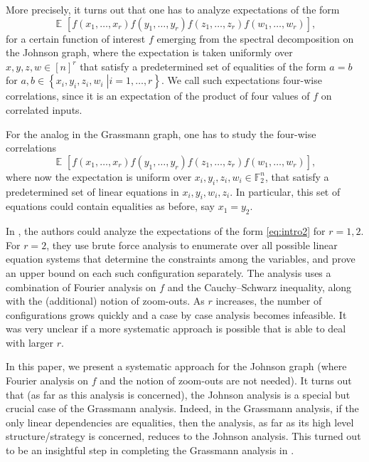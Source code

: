 \documentclass{toc}
\newcommand\sett[2]{\left\{ \left. #1 \;\right\vert #2 \right\}}
\newcommand\Expect[2]{{\mathop{\mathbb{E}}_{#1}\left[ {#2} \right]}}
\begin{document}
More precisely, it turns out that one has to analyze expectations of the form
\begin{equation}\label{eq:intro}
\Expect{}{f(x_1,\ldots,x_r)f(y_1,\ldots,y_r)f(z_1,\ldots,z_r)f(w_1,\ldots,w_r)},
\end{equation}
for a certain function of interest $f$ emerging from the spectral decomposition on the Johnson graph, %
where the expectation is taken
uniformly over $x,y,z,w\in [n]^r$ that satisfy a predetermined set of equalities of the form $a = b$ for $a,b\in\sett{x_i,y_i,z_i,w_i}{i=1,\ldots,r}$.
We call such expectations four-wise correlations, since it is an expectation of the product of four values of $f$ on correlated inputs.

For the analog in the Grassmann graph, %
 one has to study the four-wise correlations
\begin{equation}\label{eq:intro2}
\Expect{}{f(x_1,\ldots,x_r)f(y_1,\ldots,y_r)f(z_1,\ldots,z_r)f(w_1,\ldots,w_r)},
\end{equation}
where now the expectation is uniform over $x_i,y_i,z_i,w_i\in \mathbb{F}_2^{n}$, that satisfy a predetermined set of linear equations in $x_i,y_i,w_i,z_i$. In particular,
this set of equations could contain equalities as before, say $x_1 = y_2$.

In \cite{DKKMSgras}, the authors could analyze the expectations of the form \eqref{eq:intro2} for $r=1,2$. For $r=2$, they use brute force analysis to enumerate
over all possible linear equation systems that determine the constraints among the variables, and prove an upper bound on each such configuration separately. %
The analysis uses
a combination of Fourier analysis on $f$ and the Cauchy--Schwarz inequality, along with the (additional) notion of zoom-outs.
As $r$ increases, the number of configurations grows quickly and a case by case analysis becomes infeasible.
It was very unclear if a more systematic approach is possible that is able to deal with larger $r$.

In this paper, we present a systematic approach for the Johnson graph %
%
(where  %
Fourier analysis on $f$ and the notion of zoom-outs %
are  %
not needed).
It turns out that (as far as this analysis is concerned), the Johnson
analysis is a special but crucial case of the Grassmann analysis. Indeed,
in the Grassmann analysis, if the only linear dependencies are
equalities, then the analysis, as far as its high level
structure/strategy is concerned, reduces to the Johnson analysis. This
turned out to be an insightful step in completing the Grassmann analysis in
\cite{KMS2}.
\end{document}

